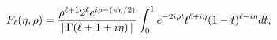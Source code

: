 \[\mathop{F_{\ell}\/}\nolimits\!\left(\eta,\rho\right)=\frac{\rho^{\ell+1}2^{%
\ell}e^{i\rho-(\pi\eta/2)}}{|\mathop{\Gamma\/}\nolimits\!\left(\ell+1+i\eta%
\right)|}\int_{0}^{1}e^{-2i\rho t}t^{\ell+i\eta}(1-t)^{\ell-i\eta}dt,\]